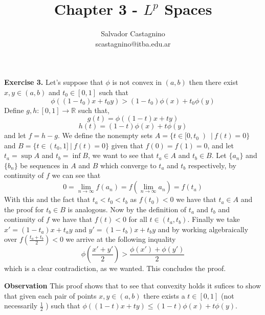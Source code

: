 \documentclass{article}
\author{Salvador Castagnino \\ scastagnino@itba.edu.ar}
\date{}
\title{Chapter 3 - $L^p$ Spaces}
\begin{document}
\maketitle

\begin{exercise}\textbf{Exercise 3.}
    Let's suppose that $\phi$ is not convex in $ \left( a,b \right)   $ then there exist $x,y \in \left( a,b \right) $ and $t_0 \in [0,1]$ such that
    \[
       \phi \left( \left( 1-t_0 \right) x + t_0 y \right) > \left( 1-t_0 \right) \phi \left( x \right) + t_0 \phi \left( y \right)  
    \]
    Define $g,h:[0,1] \rightarrow \mathbb{R}$ such that,
    \[
       g \left( t \right) = \phi \left( \left( 1-t \right) x + t y \right)
    \]
    \[
       h \left( t \right) = \left( 1-t \right) \phi \left( x \right) + t \phi \left( y \right)  
    \]
    and let $f = h - g$. We define the nonempty sets $A = \{t \in [0,t_0\left)\ |\ f(t)=0\}$ and $B = \{t \in \left(t_0, 1]\ |\ f(t)=0\}$ given that $f \left( 0 \right) = f \left( 1 \right) = 0$, and let $t_a = \sup A$ and $t_b = \inf B$, we want to see that $t_a \in A$  and $t_b \in B$. Let $\{a_n\}$ and $\{b_n\}$ be sequences in $A$ and $B$ which converge to $t_a$ and $t_b$ respectively, by continuity of $f$ we can see that
    \[
        0 = \lim_{n \to \infty} f \left( a_n \right) = f \left( \lim_{n \to \infty} a_n \right) = f \left( t_a \right) 
    \]
    With this and the fact that $t_a < t_0 < t_b$ as $f \left( t_0 \right) < 0$ we have that $t_a \in A$ and the proof for $t_b \in B$ is analogous. Now by the definition of $t_a$ and $t_b$ and continuity of $f$ we have that $f \left( t \right) < 0$ for all $t \in \left( t_a,t_b \right)$. Finally we take $x'= \left( 1-t_a \right) x+t_ay$ and $y' = \left( 1-t_b \right) x+t_by$ and by working algebraically over $f \left( \frac{t_a+t_b}{2} \right) < 0$ we arrive at the following inquality
    \[
        \phi \left( \frac{x'+y'}{2} \right) > \frac{\phi \left( x' \right) + \phi \left( y' \right) }{2}
    \]
    which is a clear contradiction, as we wanted. This concludes the proof.

    
\end{exercise}

\bigbreak

\begin{observation}\textbf{Observation}
    This proof shows that to see that convexity holds it sufices to show that given each pair of points $x,y \in \left( a,b \right) $ there exists a $t \in [0,1]$ (not necessarily $\frac{1}{2}$ ) such that $\phi \left( \left( 1-t \right) x + t y \right) \le  \left( 1-t \right) \phi \left( x \right) + t \phi \left( y \right)$. 
\end{observation}
\end{document}

